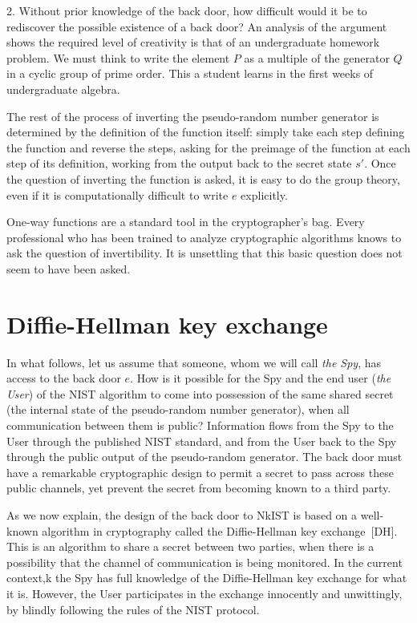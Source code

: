 \documentclass[11pt]{amsart} %
\begin{document}
2.  Without prior knowledge of the back door, how difficult would it
be to rediscover the possible existence of a back door?  An analysis of the argument shows the 
required level of creativity 
 is that of an undergraduate homework problem.  We must think
to write the element $P$ as a multiple of the generator $Q$ in a cyclic group of prime order. 
This a student learns in the first weeks of undergraduate algebra.
 
The rest of the process
of inverting the pseudo-random number generator is determined by the definition of the
function itself: simply take each step defining the function
and reverse the steps, asking for the preimage of the function at each step of its definition, working
from the output back to the secret state $s'$.
Once the question of inverting the function is asked, it is easy to do the group theory, even if it
is computationally difficult to write $e$ explicitly.

One-way functions are a standard tool in the cryptographer's bag.
Every professional who has been trained to analyze cryptographic algorithms knows to
ask the question of invertibility.  It is unsettling 
that this basic question does not seem to have been asked.


\section{Diffie-Hellman key exchange}

 In what follows, let us assume that someone, whom we will call {\it the Spy}, has access
to the back door $e$. How is it possible for the Spy and the end user ({\it the User}) of the NIST
algorithm to come into possession of the same shared secret (the internal state of the
pseudo-random number generator), when all communication between them is public?
Information flows from the Spy to the User through the published NIST standard, and from
the User back to the Spy through the public output of the pseudo-random generator.
The back door must have a remarkable cryptographic design to permit a secret to pass across 
these public channels, yet prevent the secret from becoming known to a third party.

As we now explain, the design of the back door to NkIST is based
on a well-known algorithm in cryptography called
the Diffie-Hellman key exchange~[DH].  This is an algorithm to share a secret between two parties, when
there is a possibility that the channel of communication is being monitored.   
In the current context,k
the Spy has full knowledge of the Diffie-Hellman key exchange for what it is.  However, the User
participates in the exchange innocently and unwittingly, by blindly 
following the rules of the NIST protocol.
\end{document}
